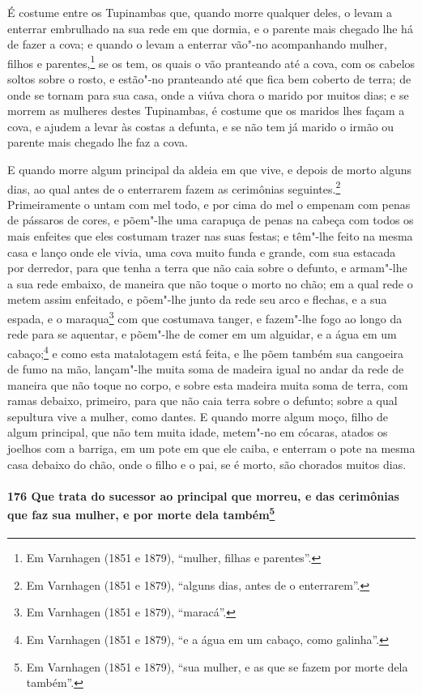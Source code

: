É costume entre os Tupinambas que, quando morre qualquer deles, o levam a enterrar
embrulhado na sua rede em que dormia, e o parente mais chegado lhe há de fazer a cova; e
quando o levam a enterrar vão"-no acompanhando mulher, filhos e parentes,\footnote{ Em
Varnhagen (1851 e 1879), ``mulher, filhas e parentes''.} se os tem, os quais o vão
pranteando até a cova, com os cabelos soltos sobre o rosto, e estão"-no pranteando até que
fica bem coberto de terra; de onde se tornam para sua casa, onde a viúva chora o marido
por muitos dias; e se morrem as mulheres destes Tupinambas, é costume que os maridos lhes
façam a cova, e ajudem a levar às costas a defunta, e se não tem já marido o irmão ou
parente mais chegado lhe faz a cova.

E quando morre algum principal da aldeia em que vive, e depois de morto alguns dias, ao
qual antes de o enterrarem fazem as cerimônias seguintes.\footnote{ Em Varnhagen (1851 e
1879), ``alguns dias, antes de o enterrarem''.} Primeiramente o untam com mel todo, e por
cima do mel o empenam com penas de pássaros de cores, e põem"-lhe uma carapuça de penas na
cabeça com todos os mais enfeites que eles costumam trazer nas suas festas; e têm"-lhe
feito na mesma casa e lanço onde ele vivia, uma cova muito funda e grande, com sua
estacada por derredor, para que tenha a terra que não caia sobre o defunto, e armam"-lhe a
sua rede embaixo, de maneira que não toque o morto no chão; em a qual rede o metem assim
enfeitado, e põem"-lhe junto da rede seu arco e flechas, e a sua espada, e o
maraqua\footnote{ Em Varnhagen (1851 e 1879), ``maracá''.} com que costumava tanger, e
fazem"-lhe fogo ao longo da rede para se aquentar, e põem"-lhe de comer em um alguidar, e a
água em um cabaço;\footnote{ Em Varnhagen (1851 e 1879), ``e a água em um cabaço, como
galinha''.} e como esta matalotagem está feita, e lhe põem também sua cangoeira de fumo na
mão, lançam"-lhe muita soma de madeira igual no andar da rede de maneira que não toque no
corpo, e sobre esta madeira muita soma de terra, com ramas debaixo, primeiro, para que não
caia terra sobre o defunto; sobre a qual sepultura vive a mulher, como dantes. E quando
morre algum moço, filho de algum principal, que não tem muita idade, metem"-no em cócaras,
atados os joelhos com a barriga, em um pote em que ele caiba, e enterram o pote na mesma
casa debaixo do chão, onde o filho e o pai, se é morto, são chorados muitos dias.

\paragraph{176 Que trata do sucessor ao principal que morreu, e das cerimônias que faz sua
mulher, e por morte dela também\protect\footnote{ Em Varnhagen (1851 e 1879), ``sua
mulher, e as que se fazem por morte dela também''.}}

